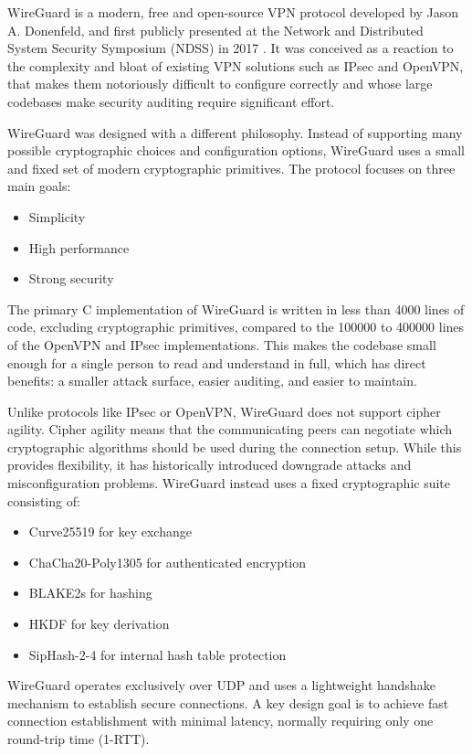 
WireGuard is a modern, free and open-source VPN protocol developed by Jason A. Donenfeld, and first publicly presented at the Network and Distributed System Security Symposium (NDSS) in 2017 \cite{wireguard}. It was conceived as a reaction to the complexity and bloat of existing VPN solutions such as IPsec and OpenVPN, that makes them notoriously difficult to configure correctly and whose large codebases make security auditing require significant effort.

WireGuard was designed with a different philosophy. Instead of supporting many possible cryptographic choices and configuration options, WireGuard uses a small and fixed set of modern cryptographic primitives. The protocol focuses on three main goals:
\begin{itemize}
    \item Simplicity
    \item High performance
    \item Strong security
\end{itemize}

The primary C implementation of WireGuard is written in less than \num{4000} lines of code, excluding cryptographic primitives, compared to the \num{100000} to \num{400000} lines of the OpenVPN and IPsec implementations. This makes the codebase small enough for a single person to read and understand in full, which has direct benefits: a smaller attack surface, easier auditing, and easier to maintain.

Unlike protocols like IPsec or OpenVPN, WireGuard does not support cipher agility. Cipher agility means that the communicating peers can negotiate which cryptographic algorithms should be used during the connection setup. While this provides flexibility, it has historically introduced downgrade attacks and misconfiguration problems. WireGuard instead uses a fixed cryptographic suite consisting of:
\begin{itemize}
    \item Curve25519 for key exchange
    \item ChaCha20-Poly1305 for authenticated encryption
    \item BLAKE2s for hashing
    \item HKDF for key derivation
    \item SipHash-2-4 for internal hash table protection
\end{itemize}

WireGuard operates exclusively over UDP and uses a lightweight handshake mechanism to establish secure connections. A key design goal is to achieve fast connection establishment with minimal latency, normally requiring only one round-trip time (1-RTT). 

